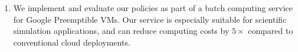 \begin{enumerate}
\item We implement and evaluate our policies as part of a batch computing service for Google Preemptible VMs. Our service is especially suitable for scientific simulation applications, and can reduce computing costs by $5\times$ compared to conventional cloud deployments. 

 
\end{enumerate}







